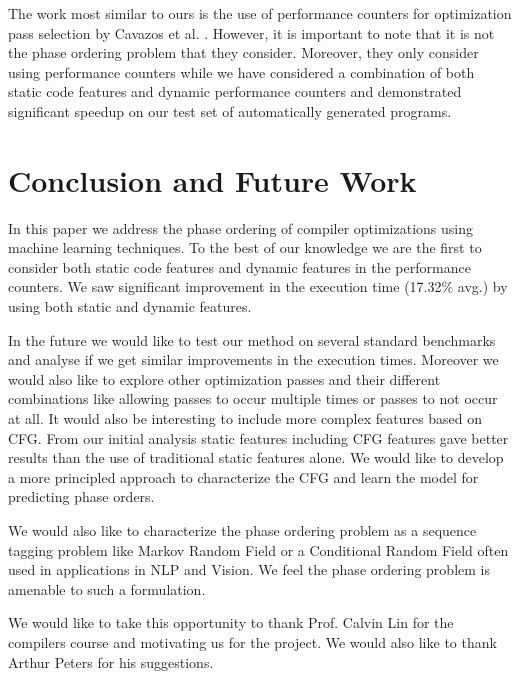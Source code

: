 \documentclass[10pt]{sigplanconf}
\begin{document}
The work most similar to ours is the use of performance counters for optimization pass selection by Cavazos et al. \cite{c7}. However, it is important to note that it is not the phase ordering problem that they consider. Moreover, they only consider using performance counters while we have considered a combination of both static code features and dynamic performance counters and demonstrated significant speedup on our test set of automatically generated programs. 

\section{Conclusion and Future Work}
In this paper we address the phase ordering of compiler optimizations using machine learning techniques. To the best of our knowledge we are the first to consider both static code features and dynamic features in the performance counters. We saw significant improvement in the execution time (17.32\% avg.) by using both static and dynamic features. 

In the future we would like to test our method on several standard benchmarks and analyse if we get similar improvements in the execution times. Moreover we would also like to explore other optimization passes and their different combinations like allowing passes to occur multiple times or passes to not occur at all. It would also be interesting to include more complex features based on CFG. From our initial analysis static features including CFG features gave better results than  the use of traditional static features alone. We would like to develop a more principled approach to characterize the CFG and learn the model for predicting phase orders. 

We would also like to characterize the phase ordering problem as a sequence tagging problem like Markov Random Field or a Conditional Random Field often used in applications in NLP and Vision. We feel the phase ordering problem is amenable to such a formulation.








%

\acks
We would like to take this opportunity to thank Prof. Calvin Lin for the compilers course and motivating us for the project. We would also like to thank Arthur Peters for his suggestions.
\end{document}
